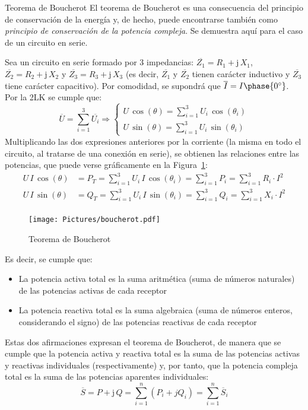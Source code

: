 \documentclass[11pt]{book} %
\makeatletter
\numberwithin{dummy}{section}
\theoremstyle{ocrenumbox}
\theoremstyle{blacknumex}
\theoremstyle{blacknumbox}
\theoremstyle{ocrenum}
\renewcommand{\subsection}{\@startsection {subsection}{2}{\z@}
{-3ex \@plus -0.1ex \@minus -.4ex}
{0.5ex \@plus.2ex }
{\normalfont\sffamily\bfseries}}
\newlength\esp
\makeatother
\begin{document}
	\subsection{Teorema de Boucherot}\label{sec.boucherot}
	El teorema de Boucherot es una consecuencia del principio de conservación de la energía y, de hecho, puede encontrarse también como \textit{principio de conservación de la potencia compleja}. Se demuestra aquí para el caso de un circuito en serie. 
	
	Sea un circuito en serie formado por 3 impedancias: $\overline{Z_1}=R_1+\mathrm{j}\,X_1$, $\overline{Z_2}=R_2+\mathrm{j}\,X_2$ y $\overline{Z_3}=R_3+\mathrm{j}\,X_3$ (es decir, $\overline{Z_1}$ y $\overline{Z_2}$ tienen carácter inductivo y $\overline{Z_3}$ tiene carácter capacitivo). Por comodidad, se supondrá que $\overline{I}=I\phase{0^\circ}$. Por la 2LK se cumple que:
	\begin{equation*}
		\overline{U}=\sum_{i=1}^3 \overline{U_i}\Rightarrow
		\begin{cases}
			U\,\cos(\theta)=\displaystyle\sum_{i=1}^3 U_i\,\cos(\theta_i)\\
			U\,\sin(\theta)=\displaystyle\sum_{i=1}^3 U_i\,\sin(\theta_i)
		\end{cases}
	\end{equation*}
	Multiplicando las dos expresiones anteriores por la corriente (la misma en todo el circuito, al tratarse de una conexión en serie), se obtienen las relaciones entre las potencias, que puede verse gráficamente en la Figura~\ref{fig.boucherot}: 
	\begin{align*}
		U\,I\,\cos(\theta)&=P_T=\displaystyle\sum_{i=1}^3 U_i\,I\,\cos(\theta_i)=\displaystyle\sum_{i=1}^3 P_i=\displaystyle\sum_{i=1}^3 R_i\cdot I^2\\
		U\,I\,\sin(\theta)&=Q_T=\displaystyle\sum_{i=1}^3 U_i\,I\,\sin(\theta_i)=\displaystyle\sum_{i=1}^3 Q_i=\displaystyle\sum_{i=1}^3 X_i\cdot I^2\\
	\end{align*}
	\begin{figure}[htbp]
		\centering
		\texttt{[image: Pictures/boucherot.pdf]}
		\caption{Teorema de Boucherot}
		\label{fig.boucherot}
	\end{figure}
	
	Es decir, se cumple que:
	\begin{itemize}
		\item La potencia activa total es la suma aritmética (suma de números naturales) de las potencias activas de cada receptor
		\item La potencia reactiva total es la suma algebraica (suma de números enteros, considerando el signo) de las potencias reactivas de cada receptor
	\end{itemize}
	Estas dos afirmaciones expresan el teorema de Boucherot, de manera que se cumple que la potencia activa y reactiva total es la suma de las potencias activas y reactivas individuales (respectivamente) y, por tanto, que la potencia compleja total es la suma de las potencias aparentes individuales: 
	\begin{equation}
		\boxed{\overline{S} =P+\mathrm{j}\,Q= \sum^n_{i = 1} (P_i + jQ_i)=\sum_{i = 1}^{n} \overline{S}_i}
	\end{equation}
	
\end{document}
